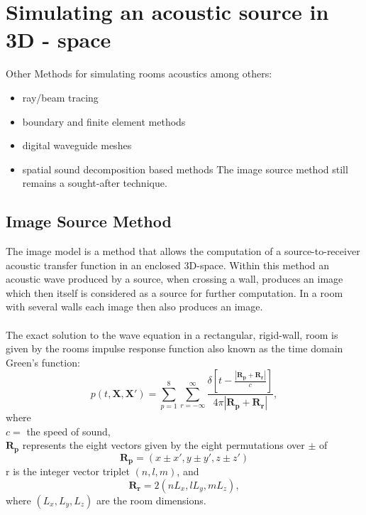 \section{Simulating an acoustic source in 3D - space}
Other Methods for simulating rooms acoustics among others:
\begin{itemize}
    \item ray/beam tracing
    \item boundary and finite element methods
    \item digital waveguide meshes
    \item spatial sound decomposition based methods
The image source method still remains a sought-after technique.\cite{Samarasinghe2018}
\end{itemize}

\subsection{Image Source Method}
The image model is a method that allows the computation of a source-to-receiver acoustic transfer function in an enclosed 3D-space. Within this method an acoustic wave produced by a source, when crossing a wall, produces an image which then itself is considered as a source for further computation. In a room with several walls each image then also produces an image.\cite{Allen1979}
\\\\
The exact solution to the wave equation in a rectangular, rigid-wall, room is given by the rooms impulse response function also known as the time domain Green's function\cite{Allen1979}:
\begin{equation}
    p(t,\mathbf{X},\mathbf{X'})=\sum_{p=1}^8\sum_{r=-\infty}^\infty\frac{\delta[t-\frac{|\mathbf{R_p}+\mathbf{R_r}|}{c}]}{4\pi|\mathbf{R_p}+\mathbf{R_r}|},
\end{equation}
where\\ 
$c=$ the speed of sound,\\
$\mathbf{R_p}$ represents the eight vectors given by the eight permutations over $\pm$ of
\begin{equation}
    \mathbf{R_p}=(x\pm x', y\pm y', z\pm z')
\end{equation}
r is the integer vector triplet $(n,l,m)$, and
\begin{equation}
    \mathbf{R_r}=2(nL_x, lL_y, mL_z),
\end{equation}
where $(L_x, L_y, L_z)$ are the room dimensions.
\\
